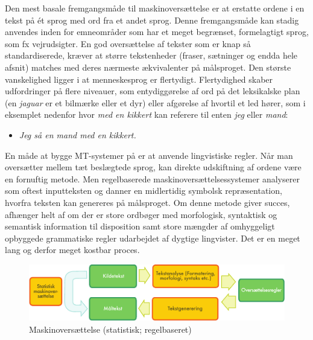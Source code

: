 \begin{multicols}{2}

Den mest basale fremgangsm\aa de til maskinovers\ae ttelse er at erstatte ordene i en tekst \mbox{p\aa} \'{e}t  sprog med ord fra et andet sprog. Denne fremgangsm\aa de kan stadig anvendes inden for emneomr\aa der som har et meget begr\ae nset, formelagtigt sprog, som fx vejrudsigter. En god overs\ae ttelse af tekster som er knap \mbox{s\aa} standardiserede, kr\ae ver at st\o rre tekstenheder (fraser, s\ae tninger og endda hele afsnit) matches med deres n\ae rmeste \ae kvivalenter \mbox{p\aa} m\aa lsproget. Den st\o rste vanskelighed ligger i at menneskesprog er flertydigt. Flertydighed skaber udfordringer \mbox{p\aa} flere niveauer, som entydigg\o relse af ord \mbox{p\aa} det leksikalske plan (en {\it jaguar} er et bilm\ae rke eller et dyr) eller afg\o relse af hvortil et led h\o rer, som i eksemplet nedenfor hvor {\it med en kikkert} kan referere til enten {\it jeg} eller {\it mand}:

\begin{itemize}
\item {\it Jeg \mbox{s\aa} en mand med en kikkert.}
\end{itemize}

En m\aa de at bygge MT-systemer \mbox{p\aa} er at anvende lingvi\-stiske regler. N\aa r man overs\ae tter mellem t\ae t besl\ae g\-tede sprog, kan direkte udskiftning af ordene v\ae re en fornuftig metode. Men regelbaserede maskinovers\ae ttelsessystemer analyserer som oftest inputteksten og danner en midlertidig symbolsk repr\ae sentation, hvorfra teksten kan genereres \mbox{p\aa} m\aa lsproget. Om denne metode giver succes, afh\ae nger helt af om der er store ordb\o ger med morfologisk, syntaktisk og semantisk information til disposition samt store m\ae ngder af omhyggeligt opbyggede grammatiske regler udarbejdet af dygtige lingvister. Det er en meget lang og derfor meget kostbar proces.

\begin{figure}[htb]
  \center
  \includegraphics[width=\textwidth]{../_media/danish/machine_translation}
  \caption{Maskinovers\ae ttelse (statistisk; regelbaseret)}
  \label{fig:mtarch_de}
\end{figure}


\end{multicols}

